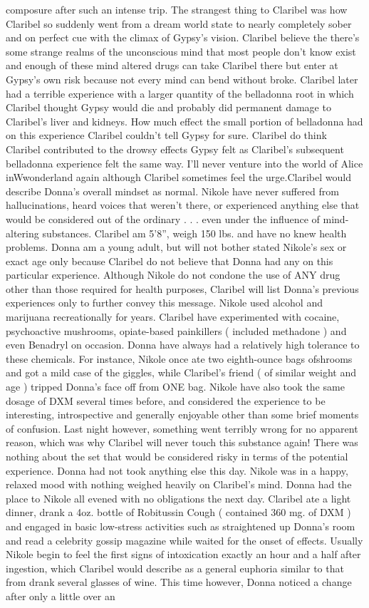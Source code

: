 \documentclass[12pt]{book}
\begin{document}
composure after such an intense trip. The strangest thing to Claribel was how Claribel so suddenly went from a dream world state to nearly completely sober and on perfect cue with the climax of Gypsy's vision. Claribel believe the there's some strange realms of the unconscious mind that most people don't know exist and enough of these mind altered drugs can take Claribel there but enter at Gypsy's own risk because not every mind can bend without broke. Claribel later had a terrible experience with a larger quantity of the belladonna root in which Claribel thought Gypsy would die and probably did permanent damage to Claribel's liver and kidneys. How much effect the small portion of belladonna had on this experience Claribel couldn't tell Gypsy for sure. Claribel do think Claribel contributed to the drowsy effects Gypsy felt as Claribel's subsequent belladonna experience felt the same way. I'll never venture into the world of Alice inWwonderland again although Claribel sometimes feel the urge.Claribel would describe Donna's overall mindset as normal. Nikole have never suffered from hallucinations, heard voices that weren't there, or experienced anything else that would be considered out of the ordinary . . .  even under the influence of mind-altering substances. Claribel am 5'8'', weigh 150 lbs. and have no knew health problems. Donna am a young adult, but will not bother stated Nikole's sex or exact age only because Claribel do not believe that Donna had any  on this particular experience. Although Nikole do not condone the use of ANY drug other than those required for health purposes, Claribel will list Donna's previous experiences only to further convey this message. Nikole used alcohol and marijuana recreationally for years. Claribel have experimented with cocaine, psychoactive mushrooms, opiate-based painkillers ( included methadone ) and even Benadryl on occasion. Donna have always had a relatively high tolerance to these chemicals. For instance, Nikole once ate two eighth-ounce bags ofshrooms and got a mild case of the giggles, while Claribel's friend ( of similar weight and age ) tripped Donna's face off from ONE bag. Nikole have also took the same dosage of DXM several times before, and considered the experience to be interesting, introspective and generally enjoyable other than some brief moments of confusion. Last night however, something went terribly wrong for no apparent reason, which was why Claribel will never touch this substance again! There was nothing about the set that would be considered risky in terms of the potential experience. Donna had not took anything else this day. Nikole was in a happy, relaxed mood with nothing weighed heavily on Claribel's mind. Donna had the place to Nikole all evened with no obligations the next day. Claribel ate a light dinner, drank a 4oz. bottle of Robitussin Cough ( contained 360 mg. of DXM ) and engaged in basic low-stress activities such as straightened up Donna's room and read a celebrity gossip magazine while waited for the onset of effects. Usually Nikole begin to feel the first signs of intoxication exactly an hour and a half after ingestion, which Claribel would describe as a general euphoria similar to that from drank several glasses of wine. This time however, Donna noticed a change after only a little over an 
\end{document}

